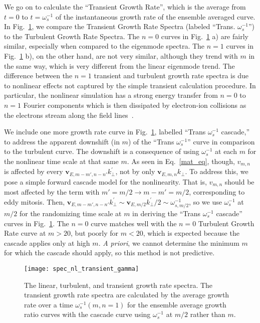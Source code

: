 \documentclass[letter,scriptaddress,twocolumn, prl,showkeys]{revtex4}
\begin{document}
We go on to calculate the ``Transient Growth Rate'', which is the average from $t=0$ to $t=\omega_s^{-1}$ of the instantaneous growth rate of the ensemble averaged curve.
In Fig.~\ref{spec_nl_transient_gamma}, we compare the Transient Growth Rate Spectra (labeled ``Trans. $\omega_s^{-1}$'') to the Turbulent Growth Rate Spectra.
The $n=0$ curves in Fig.~\ref{spec_nl_transient_gamma} a) are fairly similar, especially when compared to the eigenmode spectra.
The $n=1$ curves in Fig.~\ref{spec_nl_transient_gamma} b), on the other hand, are not very similar, although they trend with $m$ in the same way, which is very different from the linear eigenmode trend.
The difference between the $n=1$ transient and turbulent growth rate spectra is due to nonlinear effects not captured by the simple transient calculation procedure. In particular, the nonlinear
simulation has a strong energy transfer from $n=0$ to $n=1$ Fourier components which is then dissipated by electron-ion collisions as the electrons stream along the field lines~\cite{friedman2012b}. 

We include one more growth rate curve in Fig.~\ref{spec_nl_transient_gamma}, labelled ``Trans $\omega_s^{-1}$ cascade,'' to address the apparent downshift (in $m$) of
the ``Trans $\omega_s^{-1}$'' curve in comparison to the turbulent curve. The downshift is a consequence of using $\omega_s^{-1}$ at each $m$ for the nonlinear time scale at that same $m$. 
As seen in Eq.~\ref{mat_eq}, though, $v_{m,n}$ is affected by every $\mathbf{v}_{E,m-m',n-n'} k^{'}_\perp$, not by only $\mathbf{v}_{E,m,n} k_\perp$. 
To address this, we pose a simple forward cascade model for the nonlinearity. That is, $v_{m,n}$ should be
most affected by the term with $m' = m/2 \rightarrow m-m' = m/2$, corresponding to eddy mitosis. Then, $\mathbf{v}_{E,m-m',n-n'} k^{'}_\perp \sim \mathbf{v}_{E,m/2} k^{'}_\perp/2 \sim \omega_{s,m/2}^{-1}$, 
so we use $\omega_s^{-1}$ at $m/2$ for the randomizing time scale at $m$ in deriving the ``Trans $\omega_s^{-1}$ cascade'' curves in Fig.~\ref{spec_nl_transient_gamma}. 
The $n=0$ curve matches well with the $n=0$ Turbulent Growth Rate curve at $m>20$, but poorly for $m<20$, which is expected because the cascade applies only at high $m$. \emph{A priori}, we
cannot determine the minimum $m$ for which the cascade should apply, so this method is not predictive.

\begin{figure}
\centerline{\texttt{[image: spec\_nl\_transient\_gamma]}}
\caption{The linear, turbulent, and transient growth rate spectra. The transient growth rate spectra are calculated by the average growth rate over a time $\omega_s^{-1}(m,n=1)$ for the ensemble average
growth ratio curves with the cascade curve using $\omega_s^{-1}$ at $m/2$ rather than $m$.}
\label{spec_nl_transient_gamma}
\end{figure}
\end{document}
